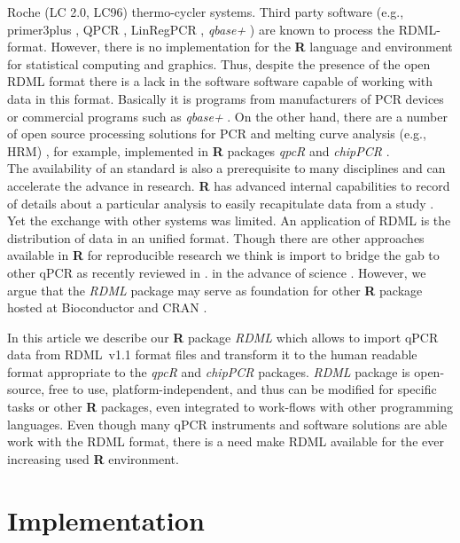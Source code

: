 \documentclass{bioinfo}
\begin{document}
Roche (LC 2.0, LC96) thermo-cycler systems. Third party software (e.g., 
primer3plus \cite{untergasser_2007}, QPCR \cite{pabinger_2009}, LinRegPCR 
\cite{ruijter_2014}, \textit{qbase+} \cite{hellemans_2007}) are known to process 
the RDML-format. However, there is no implementation for the \textbf{R} language 
and environment for statistical computing and graphics. Thus, despite the 
presence of the open RDML format there is a lack in the software software 
capable of working with data in this format. Basically it is programs from 
manufacturers of PCR devices or commercial programs such as \textit{qbase+} 
\cite{rdml}. On the other hand, there are a number of open source processing 
solutions for PCR and melting curve analysis (e.g., HRM) 
\cite{roediger_RJ_2013,cousins_2012}, for example, implemented in \textbf{R} 
packages \textit{qpcR}\cite{ritz_qpcr:_2008} and \textit{chipPCR} 
\cite{roediger_chippcr_2014}.\\

The availability of an standard is also a prerequisite to many disciplines and 
can accelerate the advance in research. \textbf{R} has advanced internal 
capabilities to record of details about a particular analysis to easily 
recapitulate data from a study \cite{liu_2014}. Yet the exchange with other 
systems was limited. An application of RDML is the distribution of data in an 
unified format. Though there are other approaches available in \textbf{R} for 
reproducible research \cite{Leeper_2014} we think is import to bridge the gab to 
other qPCR as recently reviewed in \cite{pabinger_2014}. in the advance of 
science \cite{gentleman_2004}. However, we argue that the \textit{RDML} package 
may serve as foundation for other \textbf{R} package hosted at Bioconductor 
\cite{gentleman_2004} and CRAN \cite{RCT}.

In this article we describe our \textbf{R} package \textit{RDML} which allows to 
import qPCR data from RDML~v1.1 format files and transform it to the human 
readable format appropriate to the \textit{qpcR} and \textit{chipPCR} packages. 
\textit{RDML} package is open-source, free to use, platform-independent, and 
thus can be modified for specific tasks or other \textbf{R} packages, even 
integrated to work-flows with other programming languages. Even though many qPCR 
instruments and software solutions are able work with the RDML format, there is 
a need make RDML available for the ever increasing used \textbf{R} environment.

\section{Implementation}
\end{document}
